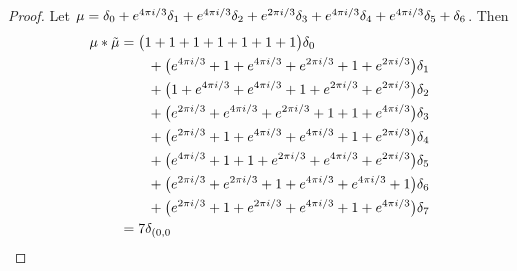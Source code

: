 \begin{proof}
Let  $\mu =  \delta_{0}+e^{4\pi i/3}\delta_{1}+e^{4\pi i/3}\delta_{2}+e^{2\pi i/3}\delta_{3}+e^{4\pi i/3}\delta_{4}+e^{4\pi i/3}\delta_{5}+\delta_{6}
$.  Then 
\begin{align*} 
\mu * \tilde \mu & = \big(1+1+1+1+1+1+1\big)\delta_{0}
\\&\qquad
+\big(e^{4\pi i/3}+1+e^{4\pi i/3}+e^{2\pi i/3}+1+e^{2\pi i/3}\big)\delta_{1}
\\&\qquad
+\big(1+e^{4\pi i/3}+e^{4\pi i/3}+1+e^{2\pi i/3}+e^{2\pi i/3}\big)\delta_{2}
\\&\qquad
+\big(e^{2\pi i/3}+e^{4\pi i/3}+e^{2\pi i/3}+1+1+e^{4\pi i/3}\big)\delta_{3}
\\&\qquad
+\big(e^{2\pi i/3}+1+e^{4\pi i/3}+e^{4\pi i/3}+1+e^{2\pi i/3}\big)\delta_{4}
\\&\qquad
+\big(e^{4\pi i/3}+1+1+e^{2\pi i/3}+e^{4\pi i/3}+e^{2\pi i/3}\big)\delta_{5}
\\&\qquad
+\big(e^{2\pi i/3}+e^{2\pi i/3}+1+e^{4\pi i/3}+e^{4\pi i/3}+1\big)\delta_{6}
\\&\qquad
+\big(e^{2\pi i/3}+1+e^{2\pi i/3}+e^{4\pi i/3}+1+e^{4\pi i/3}\big)\delta_{7}\\&=7\delta_{(0 , 0}\qedhere
\end{align*}
\end{proof}

